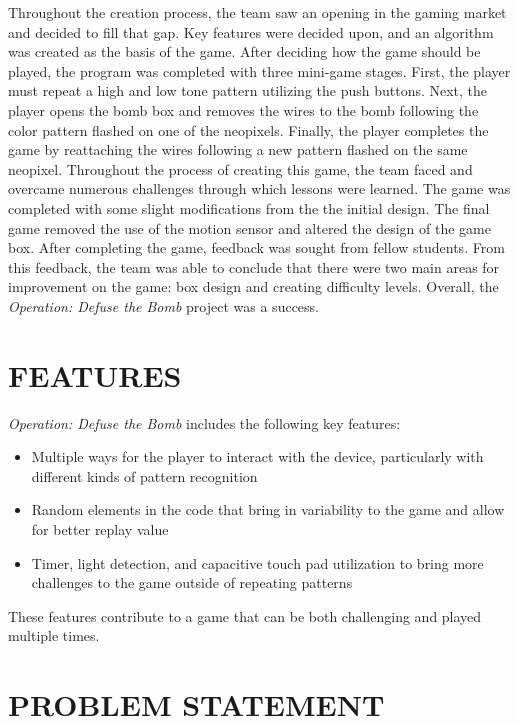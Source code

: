 \documentclass[12pt]{article}
\begin{document}
Throughout the creation process, the team saw an opening in the gaming market and decided to fill that gap.  Key features were decided upon, and an algorithm was created as the basis of the game.  After deciding how the game should be played, the program was completed with three mini-game stages.  First, the player must repeat a high and low tone pattern utilizing the push buttons. Next, the player opens the bomb box and removes the wires to the bomb following the color pattern flashed on one of the neopixels.  Finally, the player completes the game by reattaching the wires following a new pattern flashed on the same neopixel.  Throughout the process of creating this game, the team faced and overcame numerous challenges through which lessons were learned.  The game was completed with some slight modifications from the the initial design.  The final game removed the use of the motion sensor and altered the design of the game box.  After completing the game, feedback was sought from fellow students.  From this feedback, the team was able to conclude that there were two main areas for improvement on the game: box design and creating difficulty levels.  Overall, the \textit{Operation: Defuse the Bomb} project was a success.

\section{FEATURES}

\textit{Operation: Defuse the Bomb} includes the following key features:
\begin{itemize}
    \item Multiple ways for the player to interact with the device, particularly with different kinds of pattern recognition
    \item Random elements in the code that bring in variability to the game and allow for better replay value
    \item Timer, light detection, and capacitive touch pad utilization to bring more challenges to the game outside of repeating patterns
\end{itemize}

These features contribute to a game that can be both challenging and played multiple times.


\section{PROBLEM STATEMENT}
\end{document}
